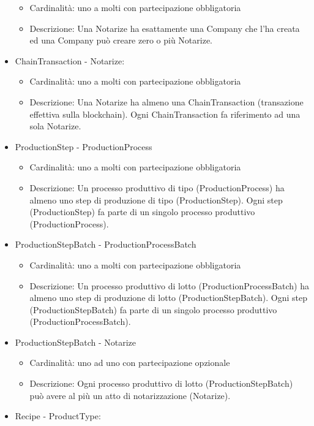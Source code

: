 \documentclass[a4paper,11pt]{article}
\begin{document}
\begin{itemize}
\begin{itemize}
          \item Cardinalità: uno a molti con partecipazione obbligatoria
          \item Descrizione: Una Notarize ha esattamente una Company che l'ha creata ed una Company può creare zero o più Notarize.
        \end{itemize}
  \item ChainTransaction - Notarize:
        \begin{itemize}
          \item Cardinalità: uno a molti con partecipazione obbligatoria
          \item Descrizione: Una Notarize ha almeno una ChainTransaction (transazione effettiva sulla blockchain). Ogni ChainTransaction fa riferimento ad una sola Notarize.
        \end{itemize}
  \item ProductionStep - ProductionProcess
        \begin{itemize}
          \item Cardinalità: uno a molti con partecipazione obbligatoria
          \item Descrizione: Un processo produttivo di tipo (ProductionProcess) ha almeno uno step di produzione di tipo (ProductionStep). Ogni step (ProductionStep) fa parte di un singolo processo produttivo (ProductionProcess).
        \end{itemize}
  \item ProductionStepBatch - ProductionProcessBatch
        \begin{itemize}
          \item Cardinalità: uno a molti con partecipazione obbligatoria
          \item Descrizione: Un processo produttivo di lotto (ProductionProcessBatch) ha almeno uno step di produzione di lotto (ProductionStepBatch). Ogni step (ProductionStepBatch) fa parte di un singolo processo produttivo (ProductionProcessBatch).
        \end{itemize}
  \item ProductionStepBatch - Notarize
        \begin{itemize}
          \item Cardinalità: uno ad uno con partecipazione opzionale
          \item Descrizione: Ogni processo produttivo di lotto (ProductionStepBatch) può avere al più un atto di notarizzazione (Notarize).
        \end{itemize}
  \item Recipe - ProductType:

\end{itemize}
\end{document}
